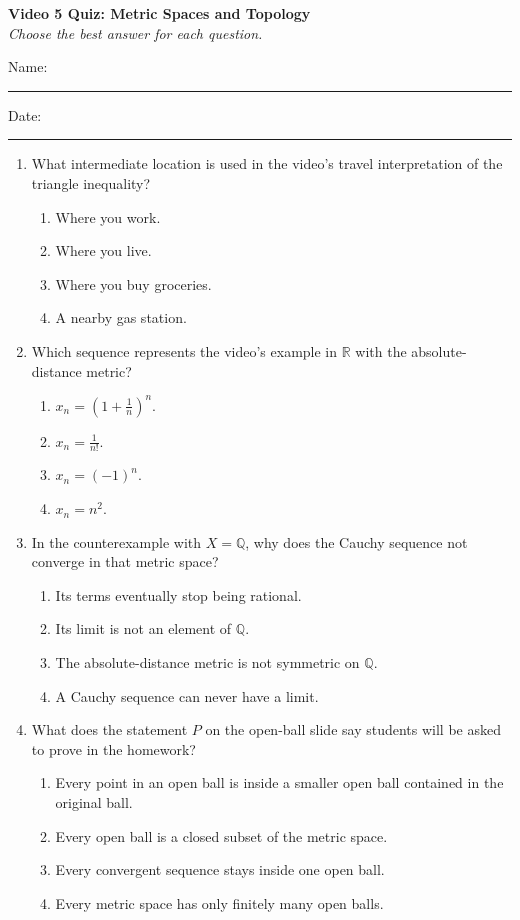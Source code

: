 \documentclass[10pt]{article}
\begin{document}
\begin{center}
  {\large\bfseries Video 5 Quiz: Metric Spaces and Topology}\\[0.25em]
  \textit{Choose the best answer for each question.}
\end{center}
\noindent Name:\ \rule{3.2in}{0.4pt}\hfill Date:\ \rule{1.25in}{0.4pt}
\vspace{0.7em}
\begin{enumerate}
  \item What intermediate location is used in the video’s travel interpretation of the triangle inequality?
  \begin{enumerate}
    \item Where you work.
    \item Where you live.
    \item Where you buy groceries.
    \item A nearby gas station.
  \end{enumerate}

  \item Which sequence represents the video’s example in $\mathbb{R}$ with the absolute-distance metric?
  \begin{enumerate}
    \item $x_n=(1+\tfrac{1}{n})^n$.
    \item $x_n=\tfrac{1}{n!}$.
    \item $x_n=(-1)^n$.
    \item $x_n=n^2$.
  \end{enumerate}

  \item In the counterexample with $X=\mathbb{Q}$, why does the Cauchy sequence not converge in that metric space?
  \begin{enumerate}
    \item Its terms eventually stop being rational.
    \item Its limit is not an element of $\mathbb{Q}$.
    \item The absolute-distance metric is not symmetric on $\mathbb{Q}$.
    \item A Cauchy sequence can never have a limit.
  \end{enumerate}

  \item What does the statement $P$ on the open-ball slide say students will be asked to prove in the homework?
  \begin{enumerate}
    \item Every point in an open ball is inside a smaller open ball contained in the original ball.
    \item Every open ball is a closed subset of the metric space.
    \item Every convergent sequence stays inside one open ball.
    \item Every metric space has only finitely many open balls.
  \end{enumerate}
\end{enumerate}
\end{document}
